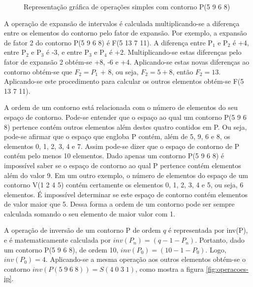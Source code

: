 \begin{figure}
  \centering
  \subfloat[Contorno P]{
    \texttt{[image: c-5968]}
    \label{fig:operacoes-p}
  }
  \subfloat[Inversão de P]{
    \texttt{[image: c-4031]}
    \label{fig:operacoes-ip}
  }

  \subfloat[Retrógrado de P]{
    \texttt{[image: c-8695]}
    \label{fig:operacoes-rp}
  }

  \subfloat[Rotação 1 de P]{
    \texttt{[image: c-9685]}
    \label{fig:operacoes-rr1}
  }
  \subfloat[Rotação 2 de P]{
    \texttt{[image: c-6859]}
    \label{fig:operacoes-rr2}
  }
  \subfloat[Rotação 3 de P]{
    \texttt{[image: c-8596]}
    \label{fig:operacoes-rr3}
  }
  \caption{Representação gráfica de operações simples com contorno P(5
  9 6 8)}
  \label{fig:operacoes-simples}
\end{figure}

A operação de expansão de intervalos é calculada multiplicando-se a
diferença entre os elementos do contorno pelo fator de expansão. Por
exemplo, a expansão de fator 2 do contorno P(5 9 6 8) é F(5 13 7
11). A diferença entre P$_1$ e P$_2$ é +4, entre P$_2$ e P$_3$ é -3, e
entre P$_3$ e P$_4$ é +2. Multiplicando-se estas diferenças pelo fator
de expansão 2 obtém-se +8, -6 e +4. Aplicando-se estas novas
diferenças ao contorno obtém-se que $F_2 = P_1$ + 8, ou seja, $F_2 = 5
+ 8$, então $F_2 = 13$. Aplicando-se este procedimento para calcular
os outros elementos obtém-se F(5 13 7 11).

A ordem de um contorno está relacionada com o número de elementos do
seu espaço de contorno. Pode-se entender que o espaço ao qual um
contorno P(5 9 6 8) pertence contém outros elementos além destes
quatro contidos em P. Ou seja, pode-se afirmar que o espaço que
engloba P contém, além de 5, 9, 6 e 8, os elementos 0, 1, 2, 3, 4 e
7. Assim pode-se dizer que o espaço de contorno de P contém pelo menos
10 elementos. Dado apenas um contorno P(5 9 6 8) é impossível saber se
o espaço de contorno ao qual P pertence contém elementos além do valor
9. Em um outro exemplo, o número de elementos do espaço de um contorno
V(1 2 4 5) contém certamente os elementos 0, 1, 2, 3, 4 e 5, ou seja,
6 elementos. É impossível determinar se este espaço de contorno contém
elementos de valor maior que 5. Dessa forma a ordem de um contorno
pode ser sempre calculada somando o seu elemento de maior valor com 1.

A operação de inversão de um contorno P de ordem $q$ é representada
por inv(P), e é matematicamente calculada por
$inv(P_n)=(q-1-P_n)$. Portanto, dado um contorno P(5 9 6 8), de ordem
10, $inv(P_0)=(10-1-P_0)$. Logo, $inv(P_0)=4$. Aplicando-se a mesma
operação aos outros elementos obtém-se o contorno
$inv(P(5\;9\;6\;8))=S(4\;0\;3\;1)$, como mostra a figura
\ref{fig:operacoes-ip}.

